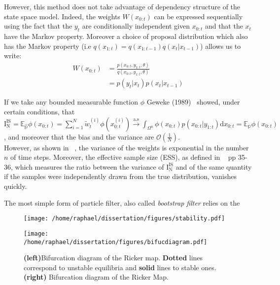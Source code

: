 \documentclass{article}
\begin{document}
	However, this method does not take advantage of dependency structure of the state space model. Indeed, the weights $W(x_{0:t})$ can be expressed sequentially using the fact that the $y_t$ are conditionally independent given $x_{0:t}$ and that the $x_t$ have the Markov property. Moreover a choice of proposal distribution which also has the Markov property (i.e $q(x_{1:t})=q(x_{1:t-1})q(x_t| x_{t-1})$) allows us to write:
	\begin{align}
		W(x_{0:t}) & = \frac{p(x_{0:t},y_{1:t}, \theta)}{q(x_{0:t},y_{1:t}, \theta)} \\
		& = p(y_t|x_t)p(x_t|x_{t-1})
	\end{align}
	
	 If we take any bounded measurable function $\phi$ Geweke (1989)~\cite{Geweke1989} showed, under certain conditions, that $\mathrm{I_N^{IS}}=\mathbb{E_{\hat{p}}}\phi(x_{0:t}) = \sum_{i=1}^{N} \tilde{w}_t^{(i)} \phi(x_{0:t}^{(i)}) \xrightarrow{\mathrm{a.s}} \int_{\Omega^n} \phi({x_{0:t}})p(x_{0:t}|y_{1:t})\mathrm{d}x_{0:t}=\mathbb{E_{{p}}}\phi(x_{0:t})$, and moreover that the bias and the variance are $\mathcal{O}(\frac{1}{N})$.\\
	 
	 However, as shown in ~\cite{kong1994sequential}, the variance of the weights is exponential in the number $n$ of time steps. Moreover, the effective sample size (ESS), as defined in ~\cite{liu2008monte} pp 35-36, which measures the ratio between the variance of $\mathrm{I_N^{IS}}$ and of the same quantity if the samples were independently drawn from the true distribution, vanishes quickly.
	 
	The most simple form of particle filter, also called \emph{bootstrap filter} relies on the 
	\begin{figure}[htb]
		\centering
		\begin{minipage}{0.4\textwidth}
			\centering
			\texttt{[image: /home/raphael/dissertation/figures/stability.pdf]}
		\end{minipage}
		\begin{minipage}{0.4\textwidth}
			\centering
			\texttt{[image: /home/raphael/dissertation/figures/bifucdiagram.pdf]}
		\end{minipage}
		\caption{\textbf{(left)}Bifurcation diagram of the Ricker map. \textbf{Dotted} lines correspond to unstable equilibria and \textbf{solid} lines to stable ones. \textbf{(right)} Bifurcation diagram of the Ricker Map.}
		\label{fig:stability}
	\end{figure}
\end{document}
